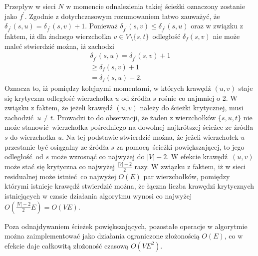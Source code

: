 {\begin{bproof}
    Przepływ w sieci $N$ w momencie odnalezienia takiej ścieżki oznaczony zostanie jako $f^\prime$.
    Zgodnie z dotychczasowym rozumowaniem łatwo zauważyć, że $\delta_{f^\prime}(s, u)=\delta_{f^\prime}(s, v) + 1$.
    Ponieważ $\delta_{f^\prime}(s, v) \leq \delta_{f^\prime}(s, u)$ oraz w związku z faktem, iż dla żadnego wierzchołka $v \in V\setminus \{s, t\}$ odległość $\delta_f(s, v)$ nie może maleć stwierdzić można, iż zachodzi \begin{align*}
        \delta_{f^\prime}(s,u)=\delta_{f^\prime}(s,v)+1\\
                           \geq\delta_f(s, v)+1\\
                              =\delta_f(s, u)+2.
    \end{align*}
    Oznacza to, iż pomiędzy kolejnymi momentami, w których krawędź $(u, v)$ staje się krytyczna odległość wierzchołka $u$ od źródła $s$ rośnie co najmniej o 2.
    W związku z faktem, że jeżeli krawędź $(u, v)$ należy do ścieżki krytycznej, musi zachodzić $u \neq t$.
    Prowadzi to do obserwacji, że żaden z wierzchołków $\{s, u, t\}$ nie może stanowić wierzchołka pośredniego na dowolnej najkrótszej ścieżce ze źródła $s$ do wierzchołka $u$.
    Na tej podstawie stwierdzić można, że jeżeli wierzchołek $u$ przestanie być osiągalny ze źródła $s$ za pomocą ścieżki powiększającej, to jego odległość od $s$ może wzrosnąć co najwyżej do $|V|-2$.
    W efekcie krawędź $(u, v)$ może stać się krytyczna co najwyżej $\frac{|V|-2}{2}$ razy.
    W związku z faktem, iż w sieci residualnej może istnieć co najwyżej $O(E)$ par wierzchołków, pomiędzy którymi istnieje krawędź stwierdzić można, że łączna liczba krawędzi krytycznych istniejących w czasie działania algorytmu wynosi co najwyżej $O(\frac{|V|-2}{2}E)=O(VE)$.
  \end{bproof}

  Poza odnajdywaniem ścieżek powiększających, pozostałe operacje w algorytmie można zaimplementować jako działania ograniczone złożonością $O(E)$, co w efekcie daje całkowitą złożoność czasową $O(VE^2)$.
}